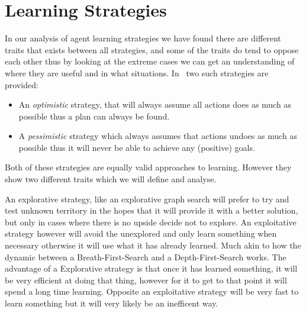\documentclass[../Master.tex]{subfiles}
\begin{document}
    \section*{Learning Strategies}\label{sec:strats}


	In our analysis of agent learning strategies we have found there are different traits that exists between all strategies, and some of the traits do tend to oppose each other thus by looking at the extreme cases we can get an understanding of where they are useful and in what situations. In~\cite{Walsh2008} two such strategies are provided:
    \begin{itemize}
    \item An \emph{optimistic} strategy, that will always assume all actions
    does as much as possible thus a plan can always be found.
    \item A \emph{pessimistic} strategy which always assumes that actions undoes
    as much as possible thus it will never be able to achieve any (positive)
    goals.
    \end{itemize}
    Both of these strategies are equally valid approaches to learning.
    However they show two different traits which we will define and analyse.
    \begin{definition}
     An explorative strategy, like an explorative graph search will prefer to try and test unknown territory in the hopes that it will provide it with a better solution, but only in cases where there is no upside decide not to explore.
    An exploitative strategy however will avoid the unexplored and only learn something when necessary otherwise it will use what it has already learned. Much akin to how the dynamic between a Breath-First-Search and a Depth-First-Search works. The advantage of a Explorative strategy is that once it has learned something, it will be very efficient at doing that thing, however for it to get to that point it will spend a long time learning. Opposite an exploitative strategy will be very fast to learn something but it will very likely be an inefficent way.
	\end{definition}
\end{document}
